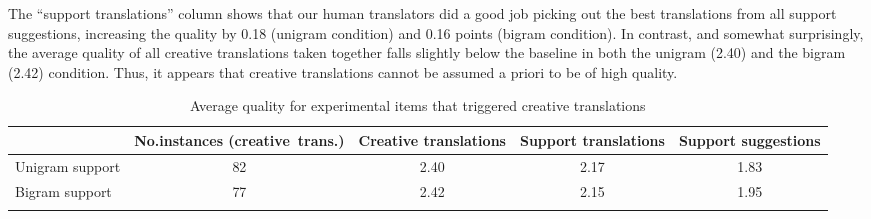 \documentclass[output=paper]{LSP/langsci}
\begin{document}
The ``support translations'' column shows that our human translators
did a good job picking out the best translations from all support
suggestions, increasing the quality by %
0.18 (unigram condition) and 0.16 points (bigram condition).  In
contrast, and somewhat surprisingly, the average quality of all
creative translations taken together falls slightly below the baseline
in both the unigram (2.40) and the bigram (2.42) condition.
Thus, it appears that creative translations cannot be assumed a priori
to be of high quality.



\begin{table}%
  \begin{tabularx}{\textwidth}{l@{}SSSS}
    \lsptoprule
            &  \mbox{No.\@ instances} \mbox{(creative trans.)}
            &  {Creative translations}
            &  {Support translations}
            &  {Support suggestions} \\ 
    \midrule
    Unigram support & 82 & 2.40 & 2.17 & 1.83 \\
    Bigram support  & 77 & 2.42 & 2.15 & 1.95 \\
    \lspbottomrule
  \end{tabularx}
  \caption{Average quality for experimental items that triggered  creative translations}
  \label{tab:creative-support-comparison}
\end{table}
\end{document}
